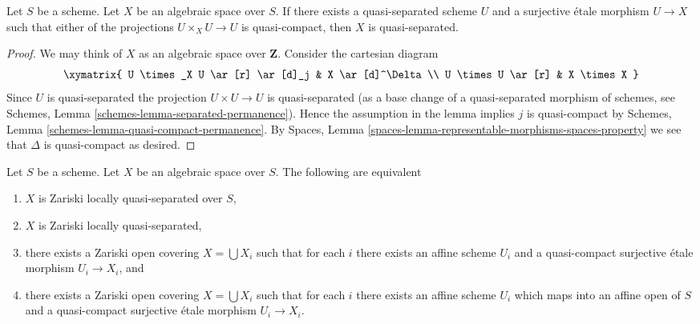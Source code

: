 \begin{lemma}
\label{lemma-quasi-separated}
Let $S$ be a scheme. Let $X$ be an algebraic space over $S$.
If there exists a quasi-separated scheme $U$ and a surjective
\'etale morphism $U \to X$ such that either of the projections
$U \times_X U \to U$ is quasi-compact, then $X$ is quasi-separated.
\end{lemma}

\begin{proof}
We may think of $X$ as an algebraic space over $\mathbf{Z}$.
Consider the cartesian diagram
$$
\xymatrix{
U \times_X U \ar[r] \ar[d]_j & X \ar[d]^\Delta \\
U \times U \ar[r] & X \times X
}
$$
Since $U$ is quasi-separated the projection $U \times U \to U$ is
quasi-separated (as a base change of a quasi-separated morphism
of schemes, see Schemes, Lemma \ref{schemes-lemma-separated-permanence}).
Hence the assumption in the lemma implies $j$ is quasi-compact by
Schemes, Lemma \ref{schemes-lemma-quasi-compact-permanence}.
By Spaces, Lemma \ref{spaces-lemma-representable-morphisms-spaces-property}
we see that $\Delta$ is quasi-compact as desired.
\end{proof}

\begin{lemma}
\label{lemma-quasi-separated-quasi-compact-pieces}
Let $S$ be a scheme.
Let $X$ be an algebraic space over $S$.
The following are equivalent
\begin{enumerate}
\item $X$ is Zariski locally quasi-separated over $S$,
\item $X$ is Zariski locally quasi-separated,
\item there exists a Zariski open covering $X = \bigcup X_i$
such that for each $i$ there exists an affine scheme
$U_i$ and a quasi-compact surjective \'etale
morphism $U_i \to X_i$, and
\item there exists a Zariski open covering $X = \bigcup X_i$
such that for each $i$ there exists an affine scheme
$U_i$ which maps into an affine open of $S$ and a quasi-compact
surjective \'etale morphism $U_i \to X_i$.
\end{enumerate}
\end{lemma}

